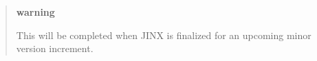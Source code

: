 \begin{quote}
{\bfseries{warning}}

This will be completed when J\+I\+NX is finalized for an upcoming minor version increment. \end{quote}
